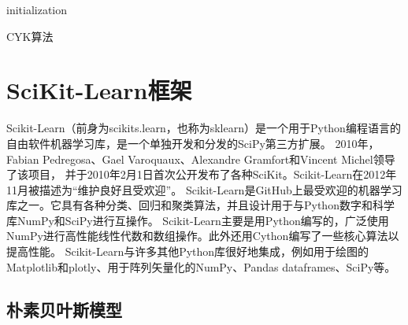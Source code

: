 \begin{algorithm}[h]
    \SetAlgoVlined
    \BlankLine

    initialization\;
     {

    }
    \caption{CYK算法}
    \label{algo:tree_construction}
\end{algorithm}


\section{SciKit-Learn框架}

Scikit-Learn（前身为scikits.learn，也称为sklearn）是一个用于Python编程语言的自由软件机器学习库\cite{pedregosa2011scikit}，是一个单独开发和分发的SciPy\cite{kramer2016scikit}第三方扩展。
2010年，Fabian Pedregosa、Gael Varoquaux、Alexandre Gramfort和Vincent Michel领导了该项目，
并于2010年2月1日首次公开发布了各种SciKit。Scikit-Learn在2012年11月被描述为“维护良好且受欢迎”\cite{bressert2012scipy}。
Scikit-Learn是GitHub\cite{gonzalez2020state}上最受欢迎的机器学习库之一。它具有各种分类、回归和聚类算法，并且设计用于与Python数字和科学库NumPy和SciPy进行互操作。
Scikit-Learn主要是用Python编写的，广泛使用NumPy进行高性能线性代数和数组操作。此外还用Cython编写了一些核心算法以提高性能。
Scikit-Learn与许多其他Python库很好地集成，例如用于绘图的Matplotlib和plotly、用于阵列矢量化的NumPy、Pandas dataframes、SciPy等。

\subsection{朴素贝叶斯模型}

